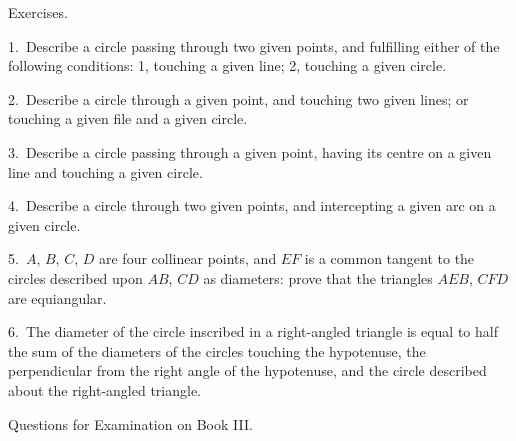 \documentclass[oneside]{book}
\newcommand\exhead[1]{
\Needspace*{5\baselineskip}\begin{center}
\textsf{#1}
\end{center}
}
\begin{document}
\exhead{Exercises.}

\begin{footnotesize}
1.~Describe a circle passing through two given points, and
fulfilling either of the following conditions: 1, touching a given
line; 2, touching a given circle.

2.~Describe a circle through a given point, and touching two
given lines; or touching\label{touchlng} a given file and a given circle.

3.~Describe a circle passing through a given point, having its
centre on a given line and touching a given circle.

4.~Describe a circle through two given points, and intercepting
a given arc on a given circle.

5.~$A$, $B$, $C$, $D$ are four collinear points, and $EF$ is a common
tangent to the circles described upon $AB$, $CD$ as diameters:
prove that the triangles $AEB$, $CFD$ are equiangular.

6.~The diameter of the circle inscribed in a right-angled triangle
is equal to half the sum of the diameters of the circles
touching the hypotenuse, the perpendicular from the right angle
of the hypotenuse, and the circle described about the right-angled
triangle.
\par\end{footnotesize}

\exhead{Questions for Examination on Book III\@.}
\end{document}
